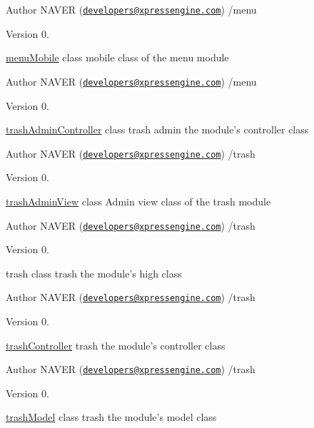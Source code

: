 \begin{DoxyAuthor}{Author}
N\+A\+V\+E\+R (\href{mailto:developers@xpressengine.com}{\tt developers@xpressengine.\+com}) /menu 
\end{DoxyAuthor}
\begin{DoxyVersion}{Version}
0.
\end{DoxyVersion}
\hyperlink{classmenuMobile}{menu\+Mobile} class mobile class of the menu module

\begin{DoxyAuthor}{Author}
N\+A\+V\+E\+R (\href{mailto:developers@xpressengine.com}{\tt developers@xpressengine.\+com}) /menu 
\end{DoxyAuthor}
\begin{DoxyVersion}{Version}
0.
\end{DoxyVersion}
\hyperlink{classtrashAdminController}{trash\+Admin\+Controller} class trash admin the module's controller class

\begin{DoxyAuthor}{Author}
N\+A\+V\+E\+R (\href{mailto:developers@xpressengine.com}{\tt developers@xpressengine.\+com}) /trash 
\end{DoxyAuthor}
\begin{DoxyVersion}{Version}
0.
\end{DoxyVersion}
\hyperlink{classtrashAdminView}{trash\+Admin\+View} class Admin view class of the trash module

\begin{DoxyAuthor}{Author}
N\+A\+V\+E\+R (\href{mailto:developers@xpressengine.com}{\tt developers@xpressengine.\+com}) /trash 
\end{DoxyAuthor}
\begin{DoxyVersion}{Version}
0.
\end{DoxyVersion}
trash class trash the module's high class

\begin{DoxyAuthor}{Author}
N\+A\+V\+E\+R (\href{mailto:developers@xpressengine.com}{\tt developers@xpressengine.\+com}) /trash 
\end{DoxyAuthor}
\begin{DoxyVersion}{Version}
0.
\end{DoxyVersion}
\hyperlink{classtrashController}{trash\+Controller} trash the module's controller class

\begin{DoxyAuthor}{Author}
N\+A\+V\+E\+R (\href{mailto:developers@xpressengine.com}{\tt developers@xpressengine.\+com}) /trash 
\end{DoxyAuthor}
\begin{DoxyVersion}{Version}
0.
\end{DoxyVersion}
\hyperlink{classtrashModel}{trash\+Model} class trash the module's model class

